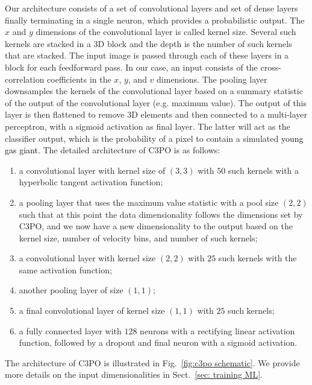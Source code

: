 \documentclass{aa}
\newcommand{\newchange}[1]{\textcolor{black}{#1}}
\begin{document}
Our architecture consists of a set of convolutional layers and set of dense layers finally terminating in a single neuron, which provides a probabilistic output.
The $x$ and $y$ dimensions of the convolutional layer is called kernel size.
Several such kernels are stacked in a 3D block and the depth is the number of such kernels that are stacked.
The input image is passed through each of these layers in a block for each feedforward pass.
In our case, an input consists of the cross-correlation coefficients in the $x$, $y$, and $v$ dimensions.
The pooling layer downsamples the kernels of the convolutional layer based on a summary statistic of the output of the convolutional layer (e.g. maximum value).
The output of this layer is then flattened to remove 3D elements and then connected to a multi-layer perceptron, with a sigmoid activation as final layer. 
The latter will act as the classifier output, which is the probability of a pixel to contain a simulated \newchange{young gas giant}. The detailed architecture of C3PO is as follows:
\begin{enumerate}
    \item a convolutional layer with kernel size of $\left(3,3\right)$ with $50$ such kernels with a hyperbolic tangent activation function;
    \item a pooling layer that uses the maximum value statistic with a pool size $(2,2)$ such that  at this point the data dimensionality follows the dimensions set by C3PO, and  we now have a new dimensionality to the output based on the kernel size, number of velocity bins, and number of such kernels;
    \item a convolutional layer with kernel size $\left(2,2\right)$ with $25$ such kernels with the same activation function;
    \item another pooling layer of size $(1,1)$;
    \item a final convolutional layer of kernel size $(1,1)$ with $25$ such kernels;
    \item a fully connected layer with $128$ neurons with a rectifying linear activation function, followed by a dropout and final neuron with a sigmoid activation.
\end{enumerate}
The architecture of C3PO is illustrated in Fig.~\ref{fig:c3po schematic}. We provide more details on the input dimensionalities in Sect.~\ref{sec: training ML}.
\end{document}
